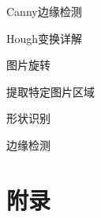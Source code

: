 \documentclass{ctexart}
\begin{document}
Canny边缘检测

Hough变换详解

图片旋转

提取特定图片区域

形状识别

边缘检测

\section{附录}
\end{document}
